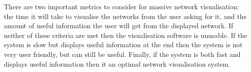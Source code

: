 \documentclass[../dissertation.tex]{subfiles}
\begin{document}
There are two important metrics to consider for massive network visualisation: the time it will take to visualise the networks from the user asking for it, and the amount of useful information the user will get from the displayed network. If neither of these criteria are met then the visualisation software is unusable. If the system is slow but displays useful information at the end then the system is not very user friendly, but can still be useful. Finally, if the system is both fast and displays useful information then it an optimal network visualisation system.
\end{document}

